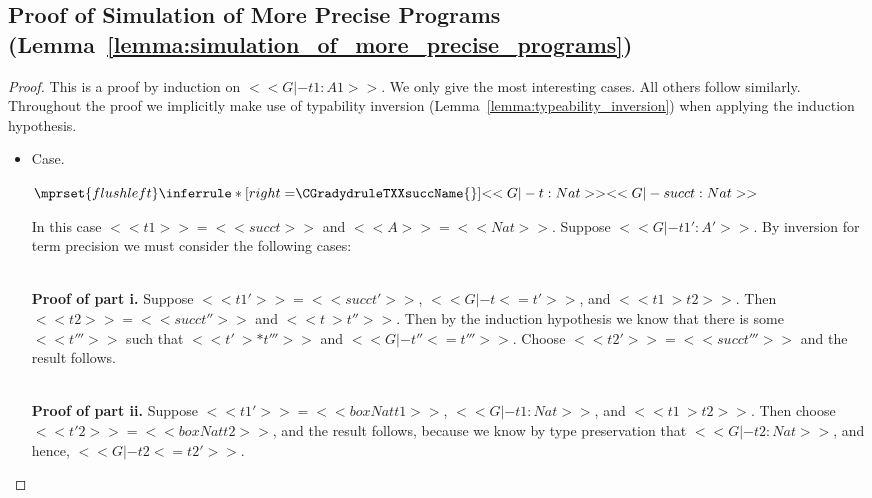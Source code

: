 \subsection{Proof of Simulation of More Precise Programs (Lemma~\ref{lemma:simulation_of_more_precise_programs})}
\label{subsec:proof_of_simulation_of_more_precise_programs_lemma:simulation_of_more_precise_programs}

\simMorePrecPro*
\begin{proof}
  This is a proof by induction on $<<G |- t1 : A1>>$.  We only give the
most interesting cases.  All others follow similarly.  Throughout the
proof we implicitly make use of typability inversion
(Lemma~\ref{lemma:typeability_inversion}) when applying the induction
hypothesis.

\begin{itemize}
\item[] Case.\ \\ 
  \begin{center}
    \begin{math}
      $$\mprset{flushleft}
      \inferrule* [right=$\CGradydruleTXXsuccName{}$] {
        <<G |- t : Nat>>
      }{<<G |- succ t : Nat>>}
    \end{math}
  \end{center}
  In this case $<<t1>> = <<succ t>>$ and $<<A>> = <<Nat>>$.  Suppose $<<G |- t1' : A'>>$.
  By inversion for term precision we must consider the following cases:

  \ \\
  \noindent
  \textbf{Proof of part i.}  Suppose $<<t1'>> = <<succ t'>>$, $<<G |- t <= t'>>$, and $<<t1 ~> t2>>$.
  Then $<<t2>> = <<succ t''>>$ and $<<t ~> t''>>$.  Then by the induction hypothesis
  we know that there is some $<<t'''>>$ such that $<<t' ~>* t'''>>$ and $<<G |- t'' <= t'''>>$.  Choose
  $<<t2'>> = <<succ t'''>>$ and the result follows.

  \ \\
  \noindent
  \textbf{Proof of part ii.} Suppose $<<t1'>> = <<box Nat t1>>$, $<<G |- t1 : Nat>>$, and $<<t1 ~> t2>>$.
  Then choose $<<t'2>> = <<box Nat t2>>$, and the result follows, because we know by type preservation
  that $<<G |- t2 : Nat>>$, and hence, $<<G |- t2 <= t2'>>$.


\end{itemize}
\end{proof}
